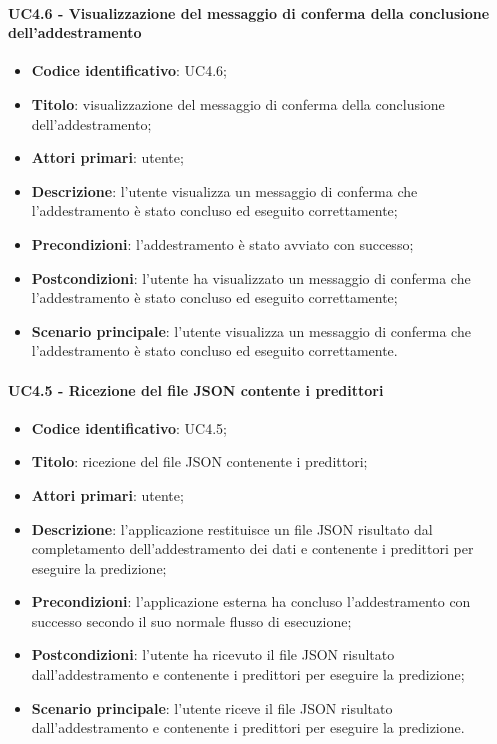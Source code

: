 \paragraph{UC4.6 - Visualizzazione del messaggio di conferma della conclusione dell'addestramento}
\begin{itemize}
	\item \textbf{Codice identificativo}: UC4.6;
	\item \textbf{Titolo}: visualizzazione del messaggio di conferma della conclusione dell'addestramento;
	\item \textbf{Attori primari}: utente;
	\item \textbf{Descrizione}: l'utente visualizza un messaggio di conferma che l'addestramento è stato concluso ed eseguito correttamente;
	\item \textbf{Precondizioni}: l'addestramento è stato avviato con successo;
	\item \textbf{Postcondizioni}: l'utente ha visualizzato un messaggio di conferma che l'addestramento è stato concluso ed eseguito correttamente;
	\item \textbf{Scenario principale}: l'utente visualizza un messaggio di conferma che l'addestramento è stato concluso ed eseguito correttamente.
\end{itemize}

\paragraph{UC4.5 - Ricezione del file JSON contente i predittori}
\begin{itemize}
    \item \textbf{Codice identificativo}: UC4.5;
    \item \textbf{Titolo}: ricezione del file JSON contenente i predittori;
    \item \textbf{Attori primari}: utente;
    \item \textbf{Descrizione}: l'applicazione restituisce un file JSON risultato dal completamento dell'addestramento dei dati e contenente i predittori per eseguire la predizione;
    \item \textbf{Precondizioni}: l'applicazione esterna ha concluso l'addestramento con successo secondo il suo normale flusso di esecuzione;
    \item \textbf{Postcondizioni}: l'utente ha ricevuto il file JSON risultato dall'addestramento e contenente i predittori per eseguire la predizione;
    \item \textbf{Scenario principale}: l'utente riceve il file JSON risultato dall'addestramento e contenente i predittori per eseguire la predizione.
\end{itemize}